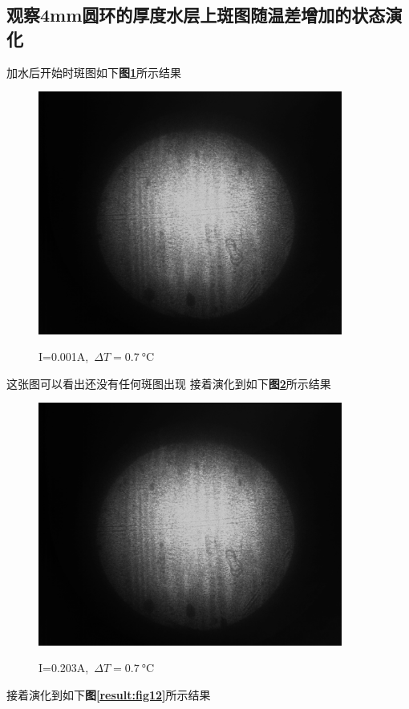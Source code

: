 \documentclass[a4paper]{article}
\begin{document}
\subsection{观察4mm圆环的厚度水层上斑图随温差增加的状态演化}\label{sub:2}
加水后开始时斑图如下\textbf{图\ref{result:fig10}}所示结果 
\begin{figure}[H]
 \centering
 \caption{I=0.001A,\ $\Delta T=\SI{0.7}{\celsius}$}
 \includegraphics[height=8cm, width=10cm]{images/30.9_31.6_0.001_5.43.bmp}
 \label{result:fig10}
\end{figure}
这张图可以看出还没有任何斑图出现
\newpage
接着演化到如下\textbf{图\ref{result:fig11}}所示结果
\begin{figure}[H]
 \centering
 \caption{I=0.203A,\ $\Delta T=\SI{0.7}{\celsius}$}
 \includegraphics[height=8cm, width=10cm]{images/30.7_31.4_0.203_5.51.bmp}
 \label{result:fig11}
\end{figure}
接着演化到如下\textbf{图\ref{result:fig12}}所示结果
\end{document}
